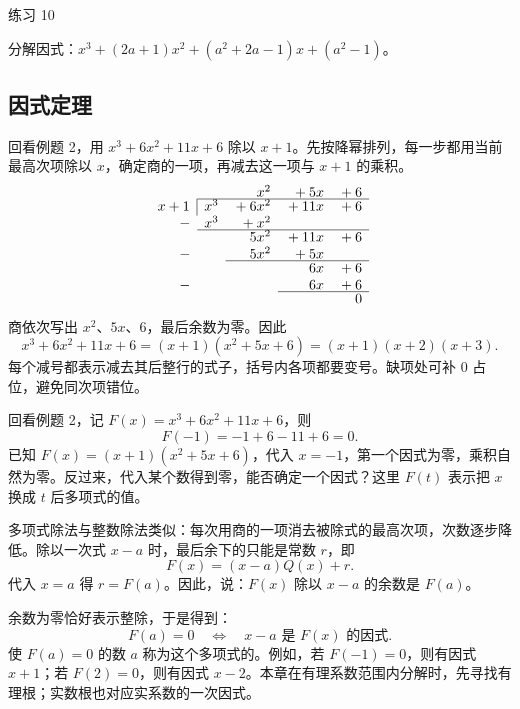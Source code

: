 \begin{problem}{练习 10}

分解因式：$x^3+(2a+1)x^2+(a^2+2a-1)x+(a^2-1)$。

\end{problem}


\subsection{因式定理}


回看例题 2，用 $x^3+6x^2+11x+6$ 除以 $x+1$。先按降幂排列，每一步都用当前最高次项除以 $x$，确定商的一项，再减去这一项与 $x+1$ 的乘积。
\[
\begin{array}{rrrrr}
      &      & x^2    & {}+5x   & {}+6\\[-2pt]
\cline{2-5}
\multicolumn{1}{r|}{x+1} & x^3 & {}+6x^2 & {}+11x & {}+6\\
-     & x^3  & {}+x^2 &         &     \\[-2pt]
\cline{2-5}
      &      & 5x^2   & {}+11x  & {}+6\\
-     &      & 5x^2   & {}+5x   &     \\[-2pt]
\cline{3-5}
      &      &        & 6x      & {}+6\\
-     &      &        & 6x      & {}+6\\[-2pt]
\cline{4-5}
      &      &        &         & 0
\end{array}
\]
商依次写出 $x^2$、$5x$、$6$，最后余数为零。因此
\[x^3+6x^2+11x+6=(x+1)(x^2+5x+6)=(x+1)(x+2)(x+3).\]
每个减号都表示减去其后整行的式子，括号内各项都要变号。缺项处可补 $0$ 占位，避免同次项错位。

回看例题 2，记 $F(x)=x^3+6x^2+11x+6$，则
\[F(-1)=-1+6-11+6=0.\]
已知 $F(x)=(x+1)(x^2+5x+6)$，代入 $x=-1$，第一个因式为零，乘积自然为零。反过来，代入某个数得到零，能否确定一个因式？这里 $F(t)$ 表示把 $x$ 换成 $t$ 后多项式的值。

多项式除法与整数除法类似：每次用商的一项消去被除式的最高次项，次数逐步降低。除以一次式 $x-a$ 时，最后余下的只能是常数 $r$，即
\[F(x)=(x-a)Q(x)+r.\]
代入 $x=a$ 得 $r=F(a)$。因此，说：$F(x)$ 除以 $x-a$ 的余数是 $F(a)$。

余数为零恰好表示整除，于是得到：
\[F(a)=0\quad\Longleftrightarrow\quad x-a\text{ 是 }F(x)\text{ 的因式}.\]
使 $F(a)=0$ 的数 $a$ 称为这个多项式的。例如，若 $F(-1)=0$，则有因式 $x+1$；若 $F(2)=0$，则有因式 $x-2$。本章在有理系数范围内分解时，先寻找有理根；实数根也对应实系数的一次因式。

